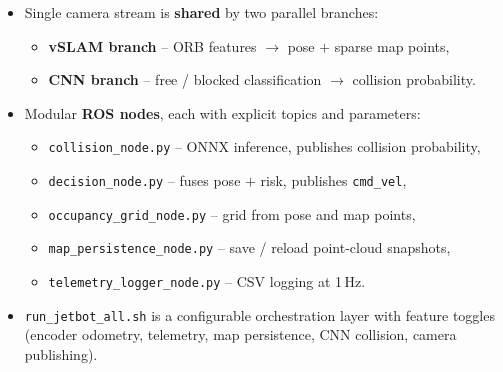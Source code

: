 {
	\begin{itemize}
		\item Single camera stream is \textbf{shared} by two parallel branches:
		\begin{itemize}
			\item \textbf{vSLAM branch} -- ORB features $\rightarrow$ pose $+$ sparse map points,
			\item \textbf{CNN branch} -- free / blocked classification $\rightarrow$ collision probability.
		\end{itemize}
		\item Modular \textbf{ROS nodes}, each with explicit topics and parameters:
		\begin{itemize}
			\item \texttt{collision\_node.py} -- ONNX inference, publishes collision probability,
			\item \texttt{decision\_node.py} -- fuses pose $+$ risk, publishes \texttt{cmd\_vel},
			\item \texttt{occupancy\_grid\_node.py} -- grid from pose and map points,
			\item \texttt{map\_persistence\_node.py} -- save / reload point-cloud snapshots,
			\item \texttt{telemetry\_logger\_node.py} -- CSV logging at 1\,Hz.
		\end{itemize}
		\item \texttt{run\_jetbot\_all.sh} is a configurable orchestration layer with feature toggles (encoder odometry, telemetry, map persistence, CNN collision, camera publishing).
	\end{itemize}
}

